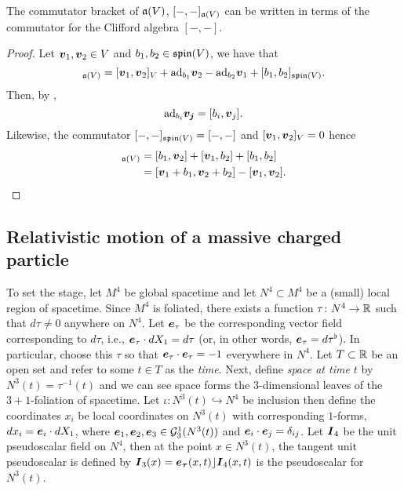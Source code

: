 \documentclass[conf]{new-aiaa}
\begin{document}
\begin{proposition}
The commutator bracket of $\mathfrak{a}(V)$, $[-,-]_{\mathfrak{a}(V)}$ can be written in terms of the commutator for the Clifford algebra $[-,-]$.
\end{proposition}
\begin{proof}
Let $\boldsymbol{v}_1,\boldsymbol{v}_2\in V$ and $b_1,b_2 \in \mathfrak{spin}(V)$, we have that 
\begin{equation}
[\blade{v}_1+b_1,\blade{v}_2+b_2]_{\liealg(V)} = [\blade{v}_1,\blade{v}_2]_{V}+\mathrm{ad}_{b_1}\blade{v}_2 - \mathrm{ad}_{b_2}\blade{v}_1 + [b_1,b_2]_{\spina(V)}.
\end{equation}
Then, by \cite[Lemma 5.7]{gracia-bondia_elements_2001}, 
\begin{equation}
\mathrm{ad}_{b_i}\boldsymbol{v_j}=[b_i,\boldsymbol{v}_j].
\end{equation}
Likewise, the commutator $[-,-]_{\mathfrak{spin}(V)}=[-,-]$ and $[\boldsymbol{v}_1,\boldsymbol{v}_2]_V=0$ hence
\begin{align}
[\blade{v}_1 + b_1,\blade{v}_2+b_2]_{\liealg(V)} &= [b_1,\blade{v}_2] + [\blade{v}_1,b_2] + [b_1,b_2]\\
&= [\blade{v}_1+b_1,\blade{v}_2+b_2]-[\blade{v}_1,\blade{v}_2].
\end{align}
\end{proof}

\subsection{Relativistic motion of a massive charged particle}

To set the stage, let $M^4$ be global spacetime and let $N^4\subset M^4$ be a (small) local region of spacetime. Since $M^4$ is foliated, there exists a function $\tau \colon N^4 \to \mathbb{R}$ such that $d\tau \neq 0$ anywhere on $N^4$. Let $\boldsymbol{e}_\tau$ be the corresponding vector field corresponding to $d\tau$, i.e., $\boldsymbol{e}_\tau \cdot dX_1 = d\tau$ (or, in other words, $\boldsymbol{e}_\tau = d\tau^\flat$).  In particular, choose this $\tau$ so that $\boldsymbol{e}_\tau\cdot \boldsymbol{e}_\tau = -1$ everywhere in $N^4$. Let $T \subset \mathbb{R}$ be an open set and refer to some $t\in T$ as the \emph{time}. Next, define \emph{space at time $t$} by $N^3(t)=\tau^{-1}(t)$ and we can see space forms the $3$-dimensional leaves of the $3+1$-foliation of spacetime. Let $\iota\colon N^3(t)\hookrightarrow N^4$ be inclusion then define the coordinates $x_{i}$ be local coordinates on $N^3(t)$ with corresponding $1$-forms, $dx_i = \boldsymbol{e}_i \cdot dX_1$, where $\boldsymbol{e}_1,\boldsymbol{e}_2,\boldsymbol{e}_3\in \mathcal{G}_{3}^1(N^3(t))$ and $\boldsymbol{e}_i\cdot \boldsymbol{e}_j = \delta_{ij}$. Let $\boldsymbol{I}_4$ be the unit pseudoscalar field on $N^4$, then at the point $x \in N^3(t)$, the tangent unit pseudoscalar is defined by $\boldsymbol{I}_3(x) = \boldsymbol{e_\tau}(x,t)\rfloor \boldsymbol{I}_4(x,t)$ is the pseudoscalar for $N^3(t)$.
\end{document}
